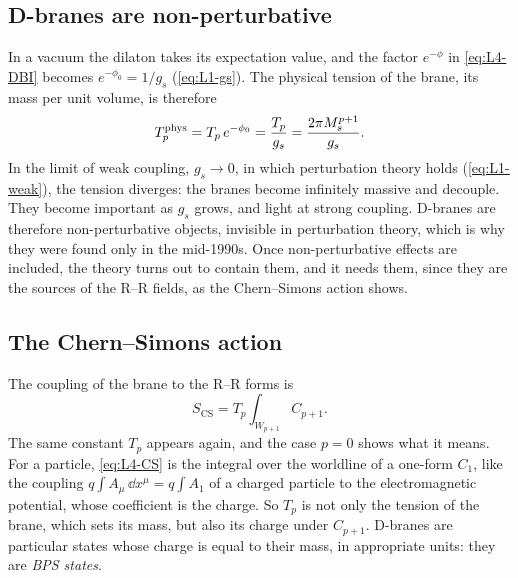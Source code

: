 \subsection{D-branes are non-perturbative}

In a vacuum the dilaton takes its expectation value, and the factor $e^{-\phi}$ in \cref{eq:L4-DBI} becomes $e^{-\phi_0} = 1/g_s$ (\cref{eq:L1-gs}). The physical tension of the brane, its mass per unit volume, is therefore
\begin{equation}
  T_p^{\text{phys}} = T_p\,e^{-\phi_0} = \frac{T_p}{g_s} = \frac{2\pi M_{s}^{p+1}}{g_s} .
  \label{eq:L4-Tphys}
\end{equation}
In the limit of weak coupling, $g_s\to0$, in which perturbation theory holds (\cref{eq:L1-weak}), the tension diverges: the branes become infinitely massive and decouple. They become important as $g_s$ grows, and light at strong coupling. D-branes are therefore non-perturbative objects, invisible in perturbation theory, which is why they were found only in the mid-1990s. Once non-perturbative effects are included, the theory turns out to contain them, and it needs them, since they are the sources of the R--R fields, as the Chern--Simons action shows.

\subsection{The Chern--Simons action}

The coupling of the brane to the R--R forms is
\begin{equation}
  S_{\text{CS}} = T_p\int_{W_{p+1}}C_{p+1} .
  \label{eq:L4-CS}
\end{equation}
The same constant $T_p$ appears again, and the case $p=0$ shows what it means. For a particle, \cref{eq:L4-CS} is the integral over the worldline of a one-form $C_1$, like the coupling $q\int A_\mu\,\dd x^\mu = q\int A_1$ of a charged particle to the electromagnetic potential, whose coefficient is the charge. So $T_p$ is not only the tension of the brane, which sets its mass, but also its charge under $C_{p+1}$. D-branes are particular states whose charge is equal to their mass, in appropriate units: they are \emph{BPS states}.

